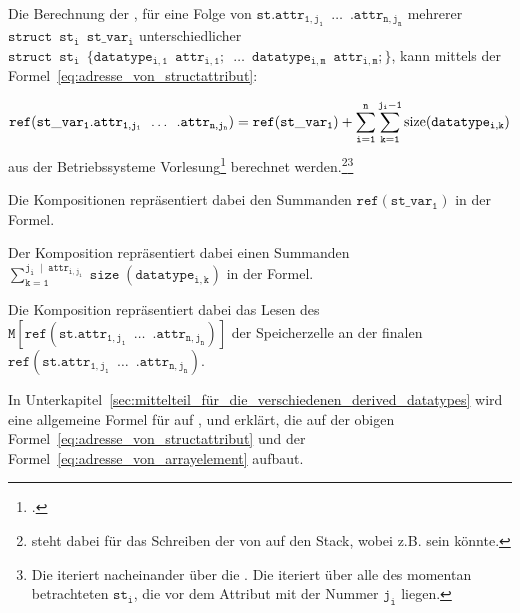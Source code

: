\begin{Special_Paragraph}
  Die Berechnung der , für eine Folge von  $\mathtt{st.attr_{1, j_1}\enspace\ldots\enspace .attr_{n, j_n}}$ mehrerer  $\mathtt{struct\enspace st_i\enspace st\_var_i}$ unterschiedlicher  $\mathtt{struct\enspace st_i\enspace \{datatype_{i, 1}\enspace attr_{i, 1};\enspace\ldots\enspace datatype_{i, m}\enspace attr_{i, m};\}}$, kann mittels der Formel~\ref{eq:adresse_von_structattribut}:

  \begin{equation}
    \mathtt{ref(st\_var_1.attr_{1, j_1}\enspace\ldots\enspace .attr_{n, j_n}) = ref(st\_var_1) + \sum_{i=1}^{n}\sum_{k=1}^{j_i - 1} \operatorname{size}(datatype_{i, k})} \\
    \label{eq:adresse_von_structattribut}
  \end{equation}
  aus der Betriebssysteme Vorlesung\footcite{scholl_betriebssysteme_2020} berechnet werden.\footnote{ steht dabei für das Schreiben der  von  auf den Stack, wobei  z.B.  sein könnte.}\footnote{Die  iteriert nacheinander über die . Die  iteriert über alle  des momentan betrachteten  $\mathtt{st_i}$, die vor dem Attribut mit der Nummer $\mathtt{j_i}$ liegen.}

  Die Kompositionen  repräsentiert dabei den Summanden $\mathtt{ref(st\_var_1)}$ in der Formel.

  Der Komposition  repräsentiert dabei einen Summanden $\mathtt{\sum_{k=1}^{j_i\;\mid\; attr_{i,j_i}} \operatorname{size}(datatype_{i, k})}$ in der Formel.

Die Komposition  repräsentiert dabei das Lesen des  $\mathtt{M\left[ref(st.attr_{1, j_1}\enspace\ldots\enspace .attr_{n, j_n})\right]}$ der Speicherzelle an der finalen   $\mathtt{ref(st.attr_{1, j_1}\enspace\ldots\enspace .attr_{n, j_n})}$.

In Unterkapitel~\ref{sec:mittelteil_für_die_verschiedenen_derived_datatypes} wird eine allgemeine Formel für  auf ,  und  erklärt, die auf der obigen Formel~\ref{eq:adresse_von_structattribut} und der Formel~\ref{eq:adresse_von_arrayelement} aufbaut.
\end{Special_Paragraph}

